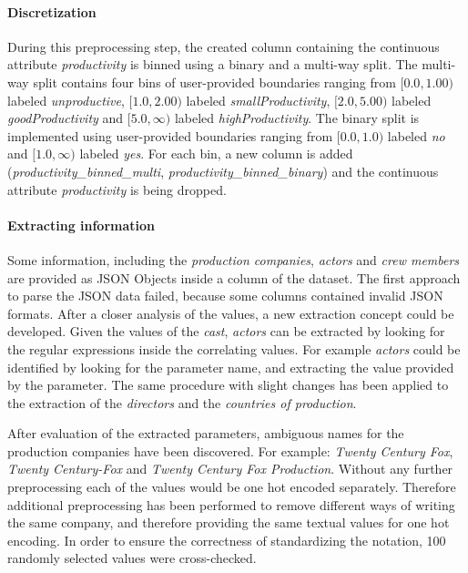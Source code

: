 \paragraph{Discretization}
During this preprocessing step, the created column containing the continuous attribute \textit{productivity} is binned using a binary and a multi-way split. The multi-way split contains four bins of user-provided boundaries ranging from $[0.0, 1.00)$ labeled \textit{unproductive}, $[1.0, 2.00)$ labeled \textit{smallProductivity}, $[2.0, 5.00)$ labeled \textit{goodProductivity} and $[5.0, \infty)$ labeled \textit{highProductivity}. The binary split is implemented using user-provided boundaries ranging from $[0.0, 1.0)$ labeled \textit{no} and $[1.0, \infty)$ labeled \textit{yes}. For each bin, a new column is added (\textit{productivity\_binned\_multi}, \textit{productivity\_binned\_binary}) and the continuous attribute \textit{productivity} is being dropped.

\paragraph{Extracting information}
Some information, including the \textit{production companies}, \textit{actors} and \textit{crew members} are provided as JSON Objects inside a column of the dataset. The first approach to parse the JSON data failed, because some columns contained invalid JSON formats. After a closer analysis of the values, a new extraction concept could be developed. Given the values of the \textit{cast}, \textit{actors} can be extracted by looking for the regular expressions inside the correlating values. For example \textit{actors} could be identified by looking for the parameter name, and extracting the value provided by the parameter. The same procedure with slight changes has been applied to the extraction of the \textit{directors} and the \textit{countries of production}.

After evaluation of the extracted parameters, ambiguous names for the production companies have been discovered. For example: \textit{Twenty Century Fox}, \textit{Twenty Century-Fox} and \textit{Twenty Century Fox Production}. Without any further preprocessing each of the values would be one hot encoded separately. Therefore additional preprocessing has been performed to remove different ways of writing the same company, and therefore providing the same textual values for one hot encoding. In order to ensure the correctness of standardizing the notation, 100 randomly selected values were cross-checked.


